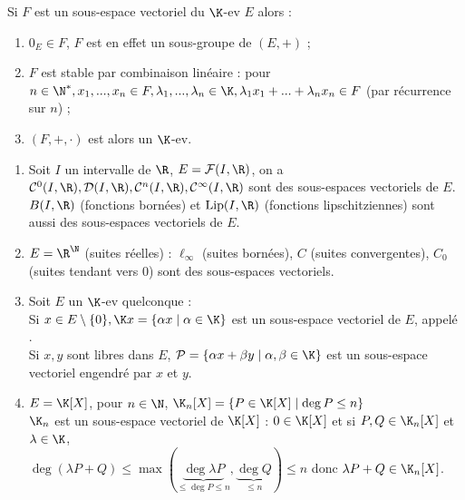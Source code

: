 \documentclass[12pt, a4paper]{report}
\begin{document}
\begin{remarque}{}
Si $F$ est un sous-espace vectoriel du $\K$-ev $E$ alors :
\begin{enumerate}
	\item $0_E \in F$, $F$ est en effet un sous-groupe de $(E,+)$ ;
	\item $F$ est stable par combinaison linéaire : pour $n \in \N^*, x_1,...,x_n \in F, \lambda_1,...,\lambda_n \in \K, \\
	\lambda_1x_1+...+\lambda_nx_n \in F$ (par récurrence sur $n$) ;
	\item $(F,+,\cdot)$ est alors un $\K$-ev.
\end{enumerate}
\end{remarque}

\begin{exemple}[Exemples]
\begin{enumerate}
	\item Soit $I$ un intervalle de $\R$, $E = \mathcal{F}(I,\R)$, on a $\mathcal{C}^0(I,\R), \mathcal{D}(I,\R), \mathcal{C}^n(I,\R), \mathcal{C}^\infty(I,\R)$ sont des sous-espaces vectoriels de $E$. \\
	$B(I,\R)$ (fonctions bornées) et $\mathrm{Lip}(I,\R)$ (fonctions lipschitziennes) sont aussi des sous-espaces vectoriels de $E$.
	
	\item $E = \R^\N$ (suites réelles) : $\ell_\infty$ (suites bornées), $C$ (suites convergentes), $C_0$ (suites tendant vers $0$) sont des sous-espaces vectoriels.
	
	\item Soit $E$ un $\K$-ev quelconque : \\
	Si $x \in E \setminus \{0\}, \K x = \{\alpha x \mid \alpha \in \K \}$ est un sous-espace vectoriel de $E$, appelé . \\
	Si $x,y$ sont libres dans $E$, $\mathcal{P} = \{\alpha x + \beta y \mid \alpha, \beta \in \K \}$ est un sous-espace vectoriel engendré par $x$ et $y$.
	
	\item $E = \K[X]$, pour $n \in \N$, $\K_n[X] = \{ P \in \K[X] \mid \deg P \le n \}$ \\
	$\K_n$ est un sous-espace vectoriel de $\K[X]$ : $0 \in \K[X]$ et si $P,Q \in \K_n[X]$ et $\lambda \in \K$, \\
	$\deg (\lambda P + Q) \le \max( \underbrace{\deg \lambda P}_{\le \deg P \le n}, \underbrace{\deg Q}_{\le n}) \le n$ donc $\lambda P + Q \in \K_n[X]$.
	

\end{enumerate}
\end{exemple}
\end{document}
